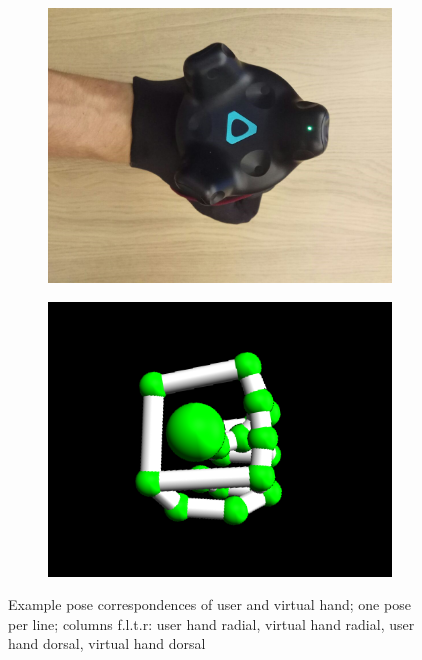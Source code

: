 \documentclass[hyperref, bachelorofscience]{cgvpub}
\begin{document}
\begin{figure}
\begin{subfigure}{.235\linewidth}
		\includegraphics[width=\linewidth]{../pics/hand_dorsal_ball}
	\end{subfigure}
	\hspace{.01cm}
	\begin{subfigure}{.235\linewidth}
		\includegraphics[width=\linewidth]{../pics/model_dorsal_ball}
	\end{subfigure}
	\caption{Example pose correspondences of user and virtual hand; one pose per line; columns f.l.t.r: user hand radial, virtual hand radial, user hand dorsal, virtual hand dorsal}
	\label{fig:hand_correspondences}
\end{figure}
\end{document}
